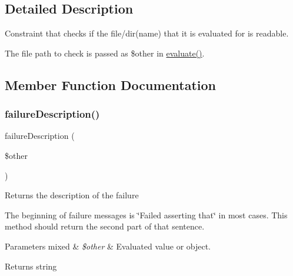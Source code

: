 \subsection{Detailed Description}
Constraint that checks if the file/dir(name) that it is evaluated for is readable.

The file path to check is passed as \$other in \mbox{\hyperlink{class_p_h_p_unit___framework___constraint_a4c184790087f7d42c3daf0d0180fe5fb}{evaluate()}}. 

\subsection{Member Function Documentation}
\mbox{\label{class_p_h_p_unit___framework___constraint___is_readable_aaabb679273bfb812df4d81c283754a59}} 
\subsubsection{\texorpdfstring{failure\+Description()}{failureDescription()}}
{\footnotesize\ttfamily failure\+Description (\begin{DoxyParamCaption}\item[{}]{\$other }\end{DoxyParamCaption})\hspace{0.3cm}{\ttfamily [protected]}}

Returns the description of the failure

The beginning of failure messages is \char`\"{}\+Failed asserting that\char`\"{} in most cases. This method should return the second part of that sentence.


\begin{DoxyParams}[1]{Parameters}
mixed & {\em \$other} & Evaluated value or object.\\
\hline
\end{DoxyParams}
\begin{DoxyReturn}{Returns}
string 
\end{DoxyReturn}
\mbox{\label{class_p_h_p_unit___framework___constraint___is_readable_a9c9c337de483bbdbb9fa249a6c7c9cc5}} 
